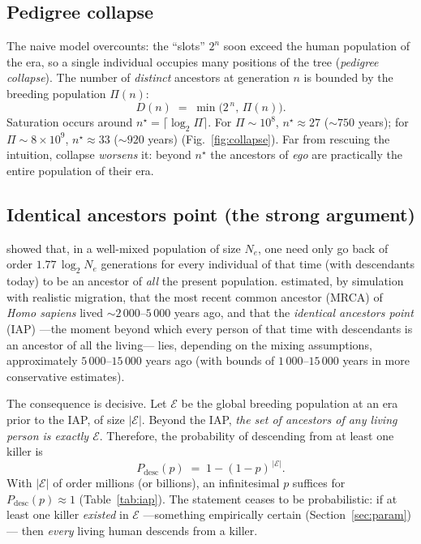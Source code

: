 \documentclass[11pt]{article}
\begin{document}
\subsection{Pedigree collapse}

The naive model overcounts: the ``slots'' $2^n$ soon exceed the human population
of the era, so a single individual occupies many positions of the tree
(\emph{pedigree collapse}). The number of \emph{distinct} ancestors at generation
$n$ is bounded by the breeding population $\Pi(n)$:
\begin{equation}\label{eq:collapse}
  D(n) \;=\; \min\!\big(2^{\,n},\, \Pi(n)\big).
\end{equation}
Saturation occurs around $n^\star = \lceil \log_2 \Pi \rceil$. For
$\Pi \sim 10^{8}$, $n^\star \approx 27$ ($\sim 750$ years); for
$\Pi \sim 8\times 10^{9}$, $n^\star \approx 33$ ($\sim 920$ years)
(Fig.~\ref{fig:collapse}). Far from rescuing the intuition, collapse
\emph{worsens} it: beyond $n^\star$ the ancestors of \emph{ego} are practically
the entire population of their era.

\subsection{Identical ancestors point (the strong argument)}

\citet{chang1999} showed that, in a well-mixed population of size $N_e$, one need
only go back of order $1{.}77\,\log_2 N_e$ generations for every individual of
that time (with descendants today) to be an ancestor of \emph{all} the present
population. \citet{rohde2004} estimated, by simulation with realistic migration,
that the most recent common ancestor (MRCA) of \emph{Homo sapiens} lived
$\sim 2\,000$--$5\,000$ years ago, and that the \emph{identical ancestors point}
(IAP) ---the moment beyond which every person of that time with descendants is an
ancestor of all the living--- lies, depending on the mixing assumptions,
approximately $5\,000$--$15\,000$ years ago (with bounds of $1\,000$--$15\,000$
years in more conservative estimates).

The consequence is decisive. Let $\mathcal{E}$ be the global breeding population
at an era prior to the IAP, of size $|\mathcal{E}|$. Beyond the IAP, \emph{the set
of ancestors of any living person is exactly $\mathcal{E}$}. Therefore, the
probability of descending from at least one killer is
\begin{equation}\label{eq:iap}
  P_{\text{desc}}(p) \;=\; 1-(1-p)^{\,|\mathcal{E}|}.
\end{equation}
With $|\mathcal{E}|$ of order millions (or billions), an infinitesimal $p$
suffices for $P_{\text{desc}}(p)\approx 1$ (Table~\ref{tab:iap}). The statement
ceases to be probabilistic: if at least one killer \emph{existed} in $\mathcal{E}$
---something empirically certain (Section~\ref{sec:param})--- then \emph{every}
living human descends from a killer.
\end{document}
